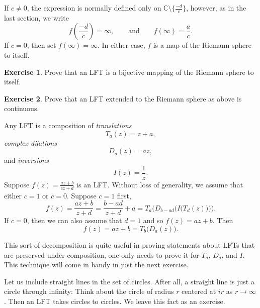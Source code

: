 \documentclass[12pt,openany]{book}
\newcommand{\C}{{\mathbb{C}}}
\theoremstyle{plain}
\theoremstyle{remark}
\theoremstyle{definition}
\newenvironment{exbox}{%
    \def\FrameCommand{\vrule width 1pt \relax\hspace{10pt}}%
    \MakeFramed{\advance\hsize-\width\FrameRestore}%
}{%
    \endMakeFramed
}
\theoremstyle{exercise}
\newtheorem{exercise}{Exercise}[section]
\theoremstyle{example}
\begin{document}
If $c\not=0$,
the expression is normally defined only on
$\C \setminus \bigl\{ \frac{-d}{c} \bigr\}$,
however, as in the last section, we write
\begin{equation*}
f\left(\frac{-d}{c}\right) = \infty, \qquad \text{and} \qquad
f(\infty) = \frac{a}{c} .
\end{equation*}
If $c=0$, then set $f(\infty) = \infty$.  In either case, $f$ is a map of
the Riemann sphere to itself.

\begin{exbox}
\begin{exercise}
Prove that an LFT is a bijective mapping of the Riemann sphere to itself.
\end{exercise}

\begin{exercise}
Prove that an LFT extended to the Riemann sphere as above is continuous.
\end{exercise}
\end{exbox}

Any LFT is a composition of \emph{translations}
\begin{equation*}
T_a(z) = z + a ,
\end{equation*}
\emph{complex dilations}
\begin{equation*}
D_a(z) = az ,
\end{equation*}
and \emph{inversions}
\begin{equation*}
I(z) = \frac{1}{z}.
\end{equation*}
Suppose $f(z) = \frac{az+b}{cz+d}$ is an LFT.
Without loss of generality, we assume that either $c=1$ or $c=0$.
Suppose $c=1$ first,
\begin{equation*}
f(z)
=
\frac{a z + b}{z + d}
=
\frac{b-ad}{z+d}+a
=
T_a\biggr(D_{b-ad}\Bigr(I\bigl(T_d(z)\bigr)\Bigr)\biggr) .
\end{equation*}
If $c=0$, then we can also assume that $d=1$ and
so $f(z) = az + b$.
Then
\begin{equation*}
f(z) = az+b = T_b\bigl(D_a(z)\bigr) .
\end{equation*}

This sort of decomposition is quite useful in proving statements about
LFTs that are preserved under composition,
one only needs to prove it for $T_a$, $D_a$, and $I$.  This technique
will come in handy in just the next exercise.

Let us include straight lines in the set of circles.  After all, a straight
line is just a circle through infinity: Think about the circle of radius $r$
centered at $ir$ as $r \to \infty$.  Then an LFT takes circles to circles.
We leave this fact as an exercise.
\end{document}
